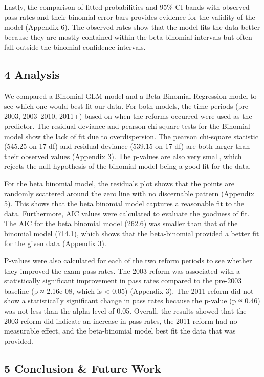 \documentclass[
]{article}
\begin{document}
Lastly, the comparison of fitted probabilities and 95\% CI bands with
observed pass rates and their binomial error bars provides evidence for
the validity of the model (Appendix 6). The observed rates show that the
model fits the data better because they are mostly contained within the
beta-binomial intervals but often fall outside the binomial confidence
intervals.

\subsection{4 Analysis}\label{analysis}

We compared a Binomial GLM model and a Beta Binomial Regression model to
see which one would best fit our data. For both models, the time periods
(pre-2003, 2003--2010, 2011+) based on when the reforms occurred were
used as the predictor. The residual deviance and pearson chi-square
tests for the Binomial model show the lack of fit due to overdispersion.
The pearson chi-square statistic (545.25 on 17 df) and residual deviance
(539.15 on 17 df) are both larger than their observed values (Appendix
3). The p-values are also very small, which rejects the null hypothesis
of the binomial model being a good fit for the data.~

For the beta binomial model, the residuals plot shows that the points
are randomly scattered around the zero line with no discernable pattern
(Appendix 5). This shows that the beta binomial model captures a
reasonable fit to the data. Furthermore, AIC values were calculated to
evaluate the goodness of fit. The AIC for the beta binomial model
(262.6) was smaller than that of the binomial model (714.1), which shows
that the beta-binomial provided a better fit for the given data
(Appendix 3).

P-values were also calculated for each of the two reform periods to see
whether they improved the exam pass rates. The 2003 reform was
associated with a statistically significant improvement in pass rates
compared to the pre-2003 baseline (p ≈ 2.16e-08, which is \textless{}
0.05) (Appendix 3). The 2011 reform did not show a statistically
significant change in pass rates because the p-value (p ≈ 0.46) was not
less than the alpha level of 0.05. Overall, the results showed that the
2003 reform did indicate an increase in pass rates, the 2011 reform had
no measurable effect, and the beta-binomial model best fit the data that
was provided.

\subsection{5 Conclusion \& Future Work}\label{conclusion-future-work}
\end{document}

